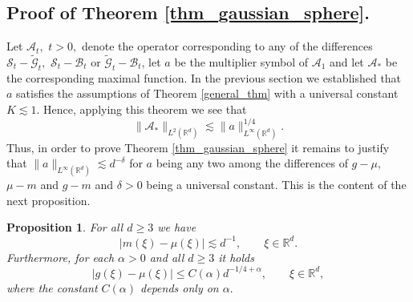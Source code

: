 \documentclass[a4paper, reqno]{amsart}
\newtheorem{proposition}[thm]{Proposition}
\theoremstyle{definition}
\newcommand{\R}{{\mathbb R}}
\newcommand{\tmG}{\tilde{\mathcal{G}}}
\newcommand{\mB}{\mathcal{B}}
\newcommand{\mS}{\mathcal{S}}
\newcommand{\mA}{\mathcal{A}}
\begin{document}
\subsection{Proof of Theorem \ref{thm_gaussian_sphere}.}

Let $\mA_t,$ $t>0,$ denote the operator corresponding to any of the differences $\mS_t-\tmG_t,$ $\mS_t-\mB_t$ or $\tmG_t-\mB_t$, let $a$ be the multiplier symbol of $\mA_1$ and let $\mA_*$ be the corresponding maximal function. In the previous section we established that $a$ satisfies the assumptions of Theorem \ref{general_thm} with a universal constant $K\lesssim 1.$ Hence, applying this theorem we see that
\begin{equation*}
\|\mA_*\|_{L^2(\R^d)}\lesssim \|a\|_{L^{\infty}(\R^d)}^{1/4}.
\end{equation*}
Thus, in order to prove  Theorem \ref{thm_gaussian_sphere} it remains to justify that $\|a\|_{L^{\infty}(\R^d)}\lesssim d^{-\delta}$ for $a$ being any two among the differences of $g-\mu,$ $\mu-m$ and $g-m$ and $\delta>0$ being a universal constant. This is the content of the next proposition.

\begin{proposition}
 \label{pro: g-mu, m-mu}
For all $d\ge 3$ we have
         \begin{equation}
       \label{eq: m-mu}
       |m(\xi)-\mu(\xi)|\lesssim d^{-1},\qquad \xi\in \R^d.
       \end{equation}
Furthermore, for each $\alpha>0$ and all $d\ge 3$ it holds
       \begin{equation}
       \label{eq: g-mu}
       |g(\xi)-\mu(\xi)|\leq C(\alpha) d^{-1/4+\alpha},\qquad \xi \in \R^d,
       \end{equation}
       where the constant $C(\alpha)$ depends only on $\alpha.$
\end{proposition}
 
\end{document}
